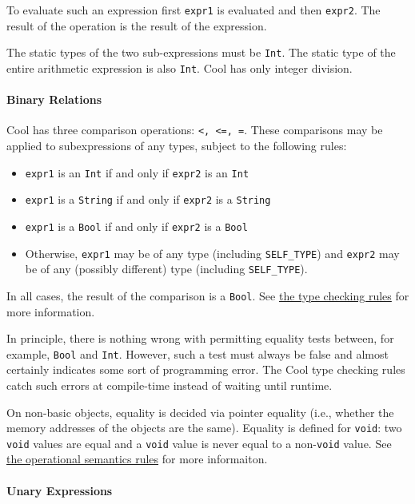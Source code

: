 \documentclass[]{article}
\begin{document}
To evaluate such an expression first \texttt{expr1} is evaluated and
then \texttt{expr2}. The result of the operation is the result of the
expression.

The static types of the two sub-expressions must be \texttt{Int}. The
static type of the entire arithmetic expression is also \texttt{Int}.
Cool has only integer division.

\paragraph{Binary Relations}

Cool has three comparison operations:
\texttt{\textless{}, \textless{}=, =}. These comparisons may be applied
to subexpressions of any types, subject to the following rules:

\begin{itemize}
\itemsep1pt\parskip0pt
\item
  \texttt{expr1} is an \texttt{Int} if and only if \texttt{expr2} is an
  \texttt{Int}
\item
  \texttt{expr1} is a \texttt{String} if and only if \texttt{expr2} is a
  \texttt{String}
\item
  \texttt{expr1} is a \texttt{Bool} if and only if \texttt{expr2} is a
  \texttt{Bool}
\item
  Otherwise, \texttt{expr1} may be of any type (including
  \texttt{SELF\_TYPE}) and \texttt{expr2} may be of any (possibly
  different) type (including \texttt{SELF\_TYPE}).
\end{itemize}

In all cases, the result of the comparison is a \texttt{Bool}. See
\href{node43.html}{the type checking rules} for more information.

In principle, there is nothing wrong with permitting equality tests
between, for example, \texttt{Bool} and \texttt{Int}. However, such a
test must always be false and almost certainly indicates some sort of
programming error. The Cool type checking rules catch such errors at
compile-time instead of waiting until runtime.

On non-basic objects, equality is decided via pointer equality (i.e.,
whether the memory addresses of the objects are the same). Equality is
defined for \texttt{void}: two \texttt{void} values are equal and a
\texttt{void} value is never equal to a non-\texttt{void} value. See
\href{node48.html}{the operational semantics rules} for more
informaiton.

\paragraph{Unary Expressions}
\end{document}
